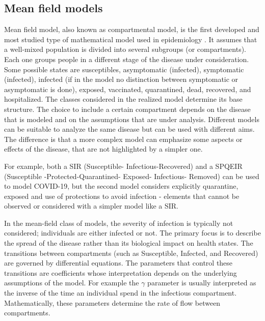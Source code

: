 \subsection{Mean field models}
\label{subsec:mean_field}
 Mean field model, also known as compartmental model, is the first developed and most studied type of mathematical model used in epidemiology \cite{kermack1927, brauer2012mathematical, Anderson_82, anderson1991infectious}. It assumes that a well-mixed population is divided into several subgroups (or compartments). Each one groups people in a different stage of the disease under consideration. Some possible states are susceptibles, asymptomatic (infected), symptomatic (infected), infected (if in the model no distinction between symptomatic or asymptomatic is done), exposed, vaccinated, quarantined, dead, recovered, and hospitalized. The classes considered in the realized model determine its base structure. The choice to include a certain compartment depends on the disease that is modeled and on the assumptions that are under analysis. Different models can be suitable to analyze the same disease but can be used with different aims. The difference is that a more complex model can emphasize some aspects or effects of the disease, that are not highlighted by a simpler one.
 
For example, both a SIR (Susceptible- Infectious-Recovered) \cite{Dehning_2020} and a SPQEIR (Susceptible -Protected-Quarantined- Exposed- Infectious- Removed) \cite{Proverbio_2021} can be used to model COVID-19, but the second model considers explicitly quarantine, exposed and use of protections to avoid infection - elements that cannot be observed or considered with a simpler model like a SIR.
  
In the mean-field class of models, the severity of infection is typically not considered; individuals are either infected or not. The primary focus is to describe the spread of the disease rather than its biological impact on health states. The transitions between compartments (such as Susceptible, Infected, and Recovered) are governed by differential equations. The parameters that control these transitions are coefficients whose interpretation depends on the underlying assumptions of the model. For example the $\gamma$ parameter is usually interpreted as the inverse of the time an individual spend in the infectious compartment. Mathematically, these parameters determine the rate of flow between compartments. 

